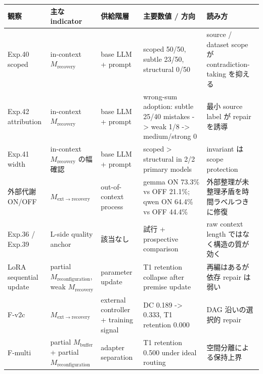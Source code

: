 \documentclass[12pt,a4paper]{article}
\begin{document}
{\def\LTcaptype{table} %
\begin{longtable}[]{@{}
  >{\raggedright\arraybackslash}p{}
  >{\raggedright\arraybackslash}p{}
  >{\raggedright\arraybackslash}p{}
  >{\raggedright\arraybackslash}p{}
  >{\raggedright\arraybackslash}p{}@{}}
\toprule\noalign{}
\begin{minipage}[b]{\linewidth}\raggedright
観察
\end{minipage} & \begin{minipage}[b]{\linewidth}\raggedright
主な indicator
\end{minipage} & \begin{minipage}[b]{\linewidth}\raggedright
供給階層
\end{minipage} & \begin{minipage}[b]{\linewidth}\raggedright
主要数値 / 方向
\end{minipage} & \begin{minipage}[b]{\linewidth}\raggedright
読み方
\end{minipage} \\
\midrule\noalign{}
\endhead
\bottomrule\noalign{}
\endlastfoot
Exp.40 scoped & in-context \(M_{\mathrm{recovery}}\) & base LLM + prompt & scoped 50/50, subtle 23/50, structural 0/50 & source / dataset scope が contradiction-taking を抑える \\
Exp.42 attribution & in-context \(M_{\mathrm{recovery}}\) & base LLM + prompt & wrong-sum adoption: subtle 25/40 mistakes -\textgreater{} weak 1/8 -\textgreater{} medium/strong 0 & 最小 source label が repair を誘導 \\
Exp.41 width & in-context \(M_{\mathrm{recovery}}\) の幅確認 & base LLM + prompt & scoped \textgreater{} structural in 2/2 primary models & invariant は scope protection \\
外部代謝 ON/OFF & \(M_{\mathrm{ext}\to\mathrm{recovery}}\) & out-of-context process & gemma ON 73.3\% vs OFF 21.1\%; qwen ON 64.4\% vs OFF 44.4\% & 外部整理が未整理矛盾を時間ラベルつきに修復 \\
Exp.36 / Exp.39 & L-side quality anchor & 該当なし & 810 試行 + prospective comparison & raw context length ではなく構造の質が効く \\
LoRA sequential update & partial \(M_{\mathrm{reconfiguration}}\), weak \(M_{\mathrm{recovery}}\) & parameter update & T1 retention collapse after premise update & 再編はあるが依存 repair は弱い \\
F-v2c & \(M_{\mathrm{ext}\to\mathrm{recovery}}\) & external controller + training signal & DC 0.189 -\textgreater{} 0.333, T1 retention 0.000 & DAG 沿いの選択的 repair \\
F-multi & partial \(M_{\mathrm{buffer}}\) + partial \(M_{\mathrm{reconfiguration}}\) & adapter separation & T1 retention 0.500 under ideal routing & 空間分離による保持上界 \\
\end{longtable}
}
\end{document}
